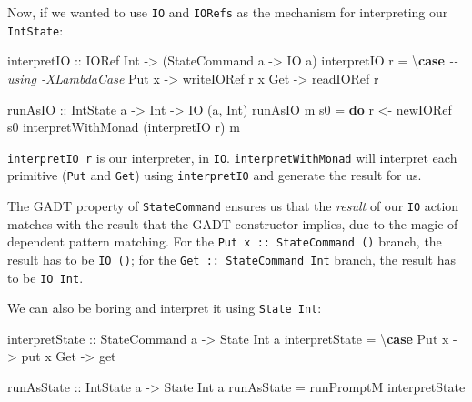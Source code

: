 \documentclass[]{article}
\newenvironment{Shaded}{}{}
\newcommand{\CommentTok}[1]{\textcolor[rgb]{0.38,0.63,0.69}{\textit{#1}}}
\newcommand{\DataTypeTok}[1]{\textcolor[rgb]{0.56,0.13,0.00}{#1}}
\newcommand{\KeywordTok}[1]{\textcolor[rgb]{0.00,0.44,0.13}{\textbf{#1}}}
\newcommand{\NormalTok}[1]{#1}
\newcommand{\OtherTok}[1]{\textcolor[rgb]{0.00,0.44,0.13}{#1}}
\begin{document}
Now, if we wanted to use \texttt{IO} and \texttt{IORefs} as the mechanism for
interpreting our \texttt{IntState}:

\begin{Shaded}
\begin{Highlighting}[]
\OtherTok{interpretIO ::} \DataTypeTok{IORef} \DataTypeTok{Int} \OtherTok{{-}\textgreater{}}\NormalTok{ (}\DataTypeTok{StateCommand}\NormalTok{ a }\OtherTok{{-}\textgreater{}} \DataTypeTok{IO}\NormalTok{ a)}
\NormalTok{interpretIO r }\OtherTok{=}\NormalTok{ \textbackslash{}}\KeywordTok{case}           \CommentTok{{-}{-} using {-}XLambdaCase}
    \DataTypeTok{Put}\NormalTok{ x }\OtherTok{{-}\textgreater{}}\NormalTok{ writeIORef r x}
    \DataTypeTok{Get}   \OtherTok{{-}\textgreater{}}\NormalTok{ readIORef r}

\OtherTok{runAsIO ::} \DataTypeTok{IntState}\NormalTok{ a }\OtherTok{{-}\textgreater{}} \DataTypeTok{Int} \OtherTok{{-}\textgreater{}} \DataTypeTok{IO}\NormalTok{ (a, }\DataTypeTok{Int}\NormalTok{)}
\NormalTok{runAsIO m s0 }\OtherTok{=} \KeywordTok{do}
\NormalTok{    r }\OtherTok{\textless{}{-}}\NormalTok{ newIORef s0}
\NormalTok{    interpretWithMonad (interpretIO r) m}
\end{Highlighting}
\end{Shaded}

\texttt{interpretIO\ r} is our interpreter, in \texttt{IO}.
\texttt{interpretWithMonad} will interpret each primitive (\texttt{Put} and
\texttt{Get}) using \texttt{interpretIO} and generate the result for us.

The GADT property of \texttt{StateCommand} ensures us that the \emph{result} of
our \texttt{IO} action matches with the result that the GADT constructor
implies, due to the magic of dependent pattern matching. For the
\texttt{Put\ x\ ::\ StateCommand\ ()} branch, the result has to be
\texttt{IO\ ()}; for the \texttt{Get\ ::\ StateCommand\ Int} branch, the result
has to be \texttt{IO\ Int}.

We can also be boring and interpret it using \texttt{State\ Int}:

\begin{Shaded}
\begin{Highlighting}[]
\OtherTok{interpretState ::} \DataTypeTok{StateCommand}\NormalTok{ a }\OtherTok{{-}\textgreater{}} \DataTypeTok{State} \DataTypeTok{Int}\NormalTok{ a}
\NormalTok{interpretState }\OtherTok{=}\NormalTok{ \textbackslash{}}\KeywordTok{case}
    \DataTypeTok{Put}\NormalTok{ x }\OtherTok{{-}\textgreater{}}\NormalTok{ put x}
    \DataTypeTok{Get}   \OtherTok{{-}\textgreater{}}\NormalTok{ get}

\OtherTok{runAsState ::} \DataTypeTok{IntState}\NormalTok{ a }\OtherTok{{-}\textgreater{}} \DataTypeTok{State} \DataTypeTok{Int}\NormalTok{ a}
\NormalTok{runAsState }\OtherTok{=}\NormalTok{ runPromptM interpretState}
\end{Highlighting}
\end{Shaded}
\end{document}
